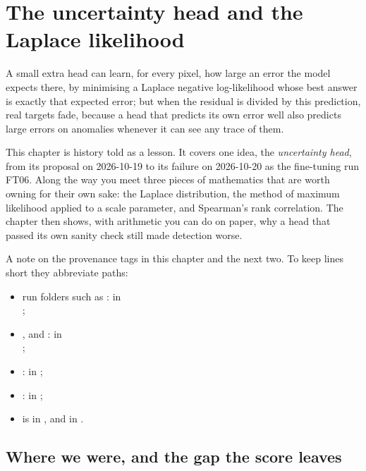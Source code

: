 \chapter{The uncertainty head and the Laplace likelihood}\label{ch:uncertainty}

\begin{onething}
A small extra head can learn, for every pixel, how large an error the model expects there, by minimising a
Laplace negative log-likelihood whose best answer is exactly that expected error; but when the residual is
divided by this prediction, real targets fade, because a head that predicts its own error well also predicts
large errors on anomalies whenever it can see any trace of them.
\end{onething}

This chapter is history told as a lesson. It covers one idea, the \emph{uncertainty head}, from its proposal
on 2026-10-19 to its failure on 2026-10-20 as the fine-tuning run FT06. Along the way you meet three pieces of
mathematics that are worth owning for their own sake: the Laplace distribution, the method of maximum
likelihood applied to a scale parameter, and Spearman's rank correlation. The chapter then shows, with
arithmetic you can do on paper, why a head that passed its own sanity check still made detection worse.

A note on the provenance tags in this chapter and the next two. To keep lines short they abbreviate
paths:
\begin{itemize}
\item run folders such as : in\\ ;
\item {},  and : in\\
  ;
\item {}: in ;
\item {}: in ;
\item {} is in , and  in .
\end{itemize}

\section{Where we were, and the gap the score leaves}\label{sec:uncertainty:where}

